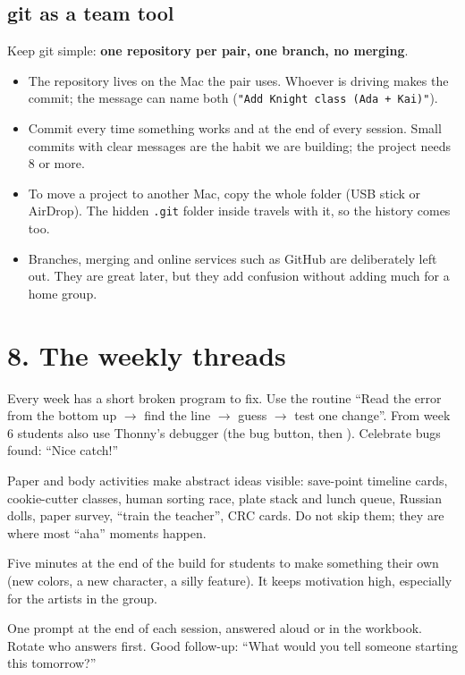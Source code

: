 \documentclass[level=3,teacher]{kidscode}
\begin{document}
\subsection{git as a team tool}
Keep git simple: \textbf{one repository per pair, one branch, no merging}.
\begin{itemize}[itemsep=2pt]
  \item The repository lives on the Mac the pair uses. Whoever is driving makes the commit; the
        message can name both (\texttt{"Add Knight class (Ada + Kai)"}).
  \item Commit every time something works and at the end of every session. Small commits with
        clear messages are the habit we are building; the project needs 8 or more.
  \item To move a project to another Mac, copy the whole folder (USB stick or AirDrop). The hidden
        \texttt{.git} folder inside travels with it, so the history comes too.
  \item Branches, merging and online services such as GitHub are deliberately left out. They are
        great later, but they add confusion without adding much for a home group.
\end{itemize}

\section{8. The weekly threads}

\begin{description}[leftmargin=0pt,itemsep=4pt,font=\bfseries]
\item[Bug hunts.] Every week has a short broken program to fix. Use the routine \enquote{Read the
error from the bottom up $\rightarrow$ find the line $\rightarrow$ guess $\rightarrow$ test one
change}. From week 6 students also use Thonny's debugger (the bug button, then ).
Celebrate bugs found: \enquote{Nice catch!}
\item[Unplugged.] Paper and body activities make abstract ideas visible: save-point timeline
cards, cookie-cutter classes, human sorting race, plate stack and lunch queue, Russian dolls,
paper survey, \enquote{train the teacher}, CRC cards. Do not skip them; they are where most
\enquote{aha} moments happen.
\item[Free-build.] Five minutes at the end of the build for students to make something their own
(new colors, a new character, a silly feature). It keeps motivation high, especially for the
artists in the group.
\item[Reflection.] One prompt at the end of each session, answered aloud or in the workbook.
Rotate who answers first. Good follow-up: \enquote{What would you tell someone starting this
tomorrow?}
\end{description}
\end{document}
